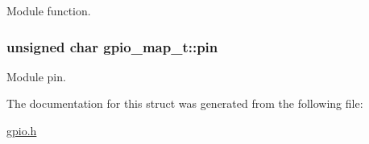 \-Module function. 

\hypertarget{structgpio__map__t_adcde0453f1866fc60d49fae253c1f61d}{
\subsubsection[{pin}]{\setlength{\rightskip}{0pt plus 5cm}unsigned char {\bf gpio\-\_\-map\-\_\-t\-::pin}}}
\label{structgpio__map__t_adcde0453f1866fc60d49fae253c1f61d}


\-Module pin. 



\-The documentation for this struct was generated from the following file\-:\begin{DoxyCompactItemize}
\item 
\hyperlink{gpio_8h}{gpio.\-h}\end{DoxyCompactItemize}
